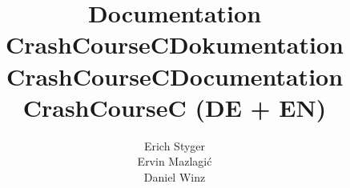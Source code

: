 \ifen
\title{Documentation CrashCourseC}
\fi %

\ifde
\title{Dokumentation CrashCourseC}
\fi

\ifen
    \ifde
        \title{Documentation CrashCourseC (DE + EN)}
    \fi
\fi
\author{Erich Styger\\Ervin Mazlagi\'c\\Daniel Winz}

